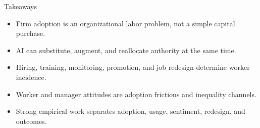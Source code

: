 \documentclass[aspectratio=169,11pt]{beamer}
\begin{document}
\begin{frame}{Takeaways}
\begin{itemize}
    \item Firm adoption is an organizational labor problem, not a simple capital purchase.
    \item AI can substitute, augment, and reallocate authority at the same time.
    \item Hiring, training, monitoring, promotion, and job redesign determine worker incidence.
    \item Worker and manager attitudes are adoption frictions and inequality channels.
    \item Strong empirical work separates adoption, usage, sentiment, redesign, and outcomes.
\end{itemize}
\end{frame}
\end{document}
